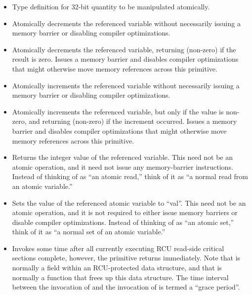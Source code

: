 \begin{itemize}
\item	{}
	Type definition for 32-bit quantity to be manipulated atomically.
\item	{}
	Atomically decrements the referenced variable without necessarily
	issuing a memory barrier or disabling compiler optimizations.
\item	{}
	Atomically decrements the referenced variable, returning
	 (non-zero) if the result is zero.
	Issues a memory barrier and disables compiler optimizations that
	might otherwise move memory references across this primitive.
\item	{}
	Atomically increments the referenced variable without necessarily
	issuing a memory barrier or disabling compiler optimizations.
\item	{}
	Atomically increments the referenced variable, but only if the
	value is non-zero, and returning  (non-zero) if the
	increment occurred.
	Issues a memory barrier and disables compiler optimizations that
	might otherwise move memory references across this primitive.
\item	{}
	Returns the integer value of the referenced variable.
	This need not be an atomic operation, and it need not issue any
	memory-barrier instructions.
	Instead of thinking of as ``an atomic read,'' think of it as
	``a normal read from an atomic variable.''
\item	{}
	Sets the value of the referenced atomic variable to ``val''.
	This need not be an atomic operation, and it is not required
	to either issue memory
	barriers or disable compiler optimizations.
	Instead of thinking of as ``an atomic set,'' think of it as
	``a normal set of an atomic variable.''
\item	{}
	Invokes  some time after all currently executing RCU
	read-side critical sections complete, however, the 
	primitive returns immediately.
	Note that  is normally a field within an RCU-protected
	data structure, and that  is normally a function that
	frees up this data structure.
	The time interval between the invocation of  and
	the invocation of  is termed a ``grace period''.

\end{itemize}
